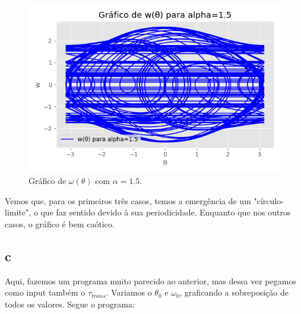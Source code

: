 \documentclass[12pt,a4paper]{article}
\begin{document}
\begin{figure}[H]
\centering
\includegraphics[width=\textwidth]{../tarefa-4b/grafico_w_theta_alpha_1.5.png}
\caption{Gráfico de $\omega(\theta)$ com $\alpha = 1.5$.}
\end{figure}

Vemos que, para os primeiros três casos, temos a emergência de um "círculo-limite", o que faz sentido devido à sua periodicidade. Enquanto que nos outros casos, o gráfico é bem caótico.

\subsection{c}
Aqui, fazemos um programa muito parecido ao anterior, mas dessa vez pegamos como input também o $\tau_{trans}$. Variamos o $\theta_0$ e $\omega_0$, graficando a sobreposição de todos os valores. Segue o programa:
\end{document}
